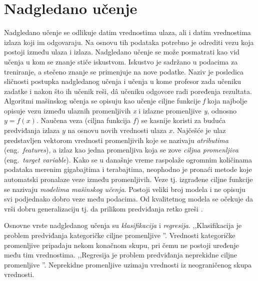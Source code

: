 \documentclass[12pt,oneside]{memoir}
\begin{document}
\section{Nadgledano učenje}
Nadgledano učenje se odlikuje datim vrednostima ulaza, ali i datim vrednostima izlaza koji im odgovaraju. Na osnovu tih podataka potrebno je odrediti vezu koja postoji između ulaza i izlaza. Nadgledano učenje se može posmatrati kao vid učenja u kom se znanje stiče iskustvom. Iskustvo je sadržano u podacima za treniranje, a stečeno znanje se primenjuje na nove podatke.  Naziv je posledica sličnosti postupka nadgledanog učenja i učenja u kome profesor zada učeniku zadatke i nakon što ih učenik reši, d\^a učeniku odgovore radi poređenja rezultata. Algoritmi mašinskog učenja se opisuju kao učenje ciljne funkcije \textit{f} koja najbolje opisuje vezu između ulaznih promenljivih \textit{x} i izlazne promenljive \textit{y}, odnosno $y=f(x)$. Naučena veza (ciljna funkcija $f$) se kasnije koristi za buduća predviđanja izlaza $y$ na osnovu novih vrednosti ulaza $x$. Najčešće je ulaz predstavljen vektorom vrednosti promenljivih koje se nazivaju \textit{atributima} (eng.~\textit{features}), a izlaz kao jedna promenljiva koja se zove \textit{ciljna promenljiva} (eng.~\textit{target variable}). 
Kako se u današnje vreme raspolaže ogromnim količinama podataka merenim gigabajtima i terabajtima, neophodno je pronaći metode koje automatski pronalaze veze između promenljivih. Veze tj. izgrađene ciljne funkcije se nazivaju \textit{modelima mašinskog učenja}. Postoji veliki broj modela i ne opisuju svi podjednako dobro veze među podacima. Od kvalitetnog modela se očekuje da vrši dobru generalizaciju tj. da prilikom predviđanja retko greši \cite{mladen, mlm, UMLFTA}. %

Osnovne vrste nadgledanog učenja su \textit{klasifikacija} i \textit{regresija}.
,,Klasifikacija je problem predviđanja kategoričke ciljne promenljive \cite{mladen}''. Vrednosti kategoričke promenljive pripadaju nekom konačnom skupu, pri čemu ne postoji uređenje među tim vrednostima. 
,,Regresija je problem predviđanja neprekidne ciljne promenljive \cite{mladen}''.  Neprekidne promenljive uzimaju vrednosti iz neograničenog skupa vrednosti.
\end{document}

